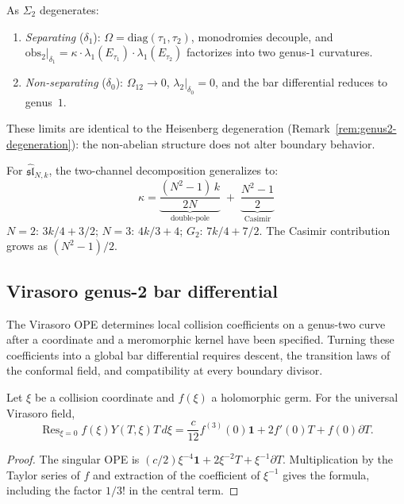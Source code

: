 \begin{remark}\label{rem:sl2-genus2-degeneration}
As $\Sigma_2$ degenerates:
\begin{enumerate}
\item \emph{Separating} ($\delta_1$): $\Omega = \mathrm{diag}(\tau_1, \tau_2)$, monodromies decouple, and $\mathrm{obs}_2|_{\delta_1} = \kappa \cdot \lambda_1(E_{\tau_1}) \cdot \lambda_1(E_{\tau_2})$ factorizes into two genus-$1$ curvatures.
\item \emph{Non-separating} ($\delta_0$): $\Omega_{12} \to 0$, $\lambda_2|_{\delta_0} = 0$, and the bar differential reduces to genus~$1$.
\end{enumerate}
These limits are identical to the Heisenberg degeneration (Remark~\ref{rem:genus2-degeneration}): the non-abelian structure does not alter boundary behavior.
\end{remark}

\begin{remark}\label{rem:genus2-higher-rank}
For $\widehat{\mathfrak{sl}}_{N,k}$, the two-channel decomposition generalizes to:
\begin{equation}\label{eq:slN-kappa-decomp-genus2}
\kappa = \underbrace{\frac{(N^2-1)\,k}{2N}}_{\text{double-pole}}
\;+\; \underbrace{\frac{N^2-1}{2}}_{\text{Casimir}}
\end{equation}
$N=2$: $3k/4 + 3/2$; $N=3$: $4k/3 + 4$; $G_2$: $7k/4 + 7/2$.  The Casimir contribution grows as $(N^2-1)/2$.
\end{remark}

\subsection{Virasoro genus-2 bar differential}\label{subsec:virasoro-genus2-bar}

The Virasoro OPE determines local collision coefficients on a genus-two curve after a coordinate and a meromorphic kernel have been specified.
Turning these coefficients into a global bar differential requires descent, the transition laws of the conformal field, and compatibility at every boundary divisor.

\begin{proposition}
\label{thm:virasoro-genus2-bar}
Let $\xi$ be a collision coordinate and $f(\xi)$ a holomorphic germ.
For the universal Virasoro field,
\begin{equation}\label{eq:vir-d2-genus2}
 \operatorname{Res}_{\xi=0}f(\xi)Y(T,\xi)T\,d\xi
 =\frac{c}{12}f^{(3)}(0)\mathbf1+2f'(0)T+f(0)\partial T.
\end{equation}
\end{proposition}
\begin{proof}
The singular OPE is $(c/2)\xi^{-4}\mathbf1+2\xi^{-2}T+\xi^{-1}\partial T$.
Multiplication by the Taylor series of $f$ and extraction of the coefficient of $\xi^{-1}$ gives the formula, including the factor $1/3!$ in the central term.
\end{proof}

